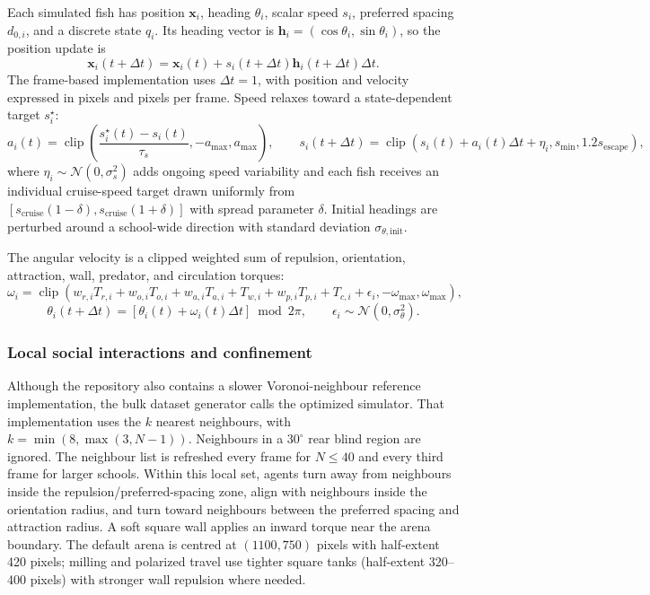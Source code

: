 \documentclass[11pt]{article}
\begin{document}
Each simulated fish has position \(\bm{x}_i\), heading \(\theta_i\), scalar speed \(s_i\), preferred
spacing \(d_{0,i}\), and a discrete state \(q_i\). Its heading vector is
\(\bm{h}_i=(\cos\theta_i,\sin\theta_i)\), so the position update is
\begin{equation}
  \bm{x}_i(t+\Delta t)=\bm{x}_i(t)+s_i(t+\Delta t)\bm{h}_i(t+\Delta t)\Delta t.
\end{equation}
The frame-based implementation uses \(\Delta t=1\), with position and velocity expressed in pixels and
pixels per frame. Speed relaxes toward a state-dependent target \(s_i^\star\):
\begin{equation}
  a_i(t)=\operatorname{clip}\!\left(
  \frac{s_i^\star(t)-s_i(t)}{\tau_s},-a_{\max},a_{\max}\right),
  \qquad
  s_i(t+\Delta t)=\operatorname{clip}\!\left(s_i(t)+a_i(t)\Delta t + \eta_i,
  s_{\min},1.2s_{\mathrm{escape}}\right),
\end{equation}
where \(\eta_i\sim\mathcal{N}(0,\sigma_s^2)\) adds ongoing speed variability and each fish receives an
individual cruise-speed target drawn uniformly from
\([s_{\mathrm{cruise}}(1-\delta),s_{\mathrm{cruise}}(1+\delta)]\) with spread parameter \(\delta\).
Initial headings are perturbed around a school-wide direction with standard deviation
\(\sigma_{\theta,\mathrm{init}}\).

The angular velocity is a clipped weighted sum of repulsion, orientation, attraction, wall, predator,
and circulation torques:
\begin{equation}
  \omega_i=\operatorname{clip}\!\left(
  w_{r,i}T_{r,i}+w_{o,i}T_{o,i}+w_{a,i}T_{a,i}
  +T_{w,i}+w_{p,i}T_{p,i}+T_{c,i}+\epsilon_i,
  -\omega_{\max},\omega_{\max}\right),
\end{equation}
\begin{equation}
  \theta_i(t+\Delta t)=\left[\theta_i(t)+\omega_i(t)\Delta t\right]\bmod 2\pi,
  \qquad \epsilon_i\sim\mathcal{N}(0,\sigma_\theta^2).
\end{equation}

\subsubsection{Local social interactions and confinement}

Although the repository also contains a slower Voronoi-neighbour reference implementation, the bulk
dataset generator calls the optimized simulator. That implementation uses the \(k\) nearest neighbours,
with \(k=\min(8,\max(3,N-1))\). Neighbours in a \(30^\circ\) rear blind region are ignored. The
neighbour list is refreshed every frame for \(N\leq40\) and every third frame for larger schools.
Within this local set, agents turn away from neighbours inside the repulsion/preferred-spacing zone,
align with neighbours inside the orientation radius, and turn toward neighbours between the preferred
spacing and attraction radius. A soft square wall applies an inward torque near the arena boundary.
The default arena is centred at \((1100,750)\) pixels with half-extent 420 pixels; milling and polarized
travel use tighter square tanks (half-extent 320--400 pixels) with stronger wall repulsion where needed.
\end{document}
